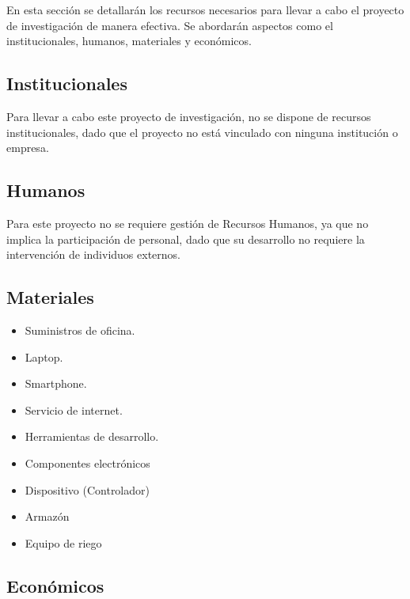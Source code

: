 En esta sección se detallarán los recursos necesarios para llevar a cabo el proyecto de investigación de manera efectiva. Se abordarán aspectos como el institucionales, humanos, materiales y económicos.
\subsection{Institucionales}
Para llevar a cabo este proyecto de investigación, no se dispone de recursos institucionales, dado que el proyecto no está vinculado con ninguna institución o empresa.

\subsection{Humanos}
Para este proyecto no se requiere gestión de Recursos Humanos, ya que no implica la participación de personal, dado que su desarrollo no requiere la intervención de individuos externos.

\subsection{Materiales}
\begin{itemize}
	\item Suministros de oficina.
	\item Laptop.
	\item Smartphone.
	\item Servicio de internet.
	\item Herramientas de desarrollo.
	\item Componentes electrónicos
	\item Dispositivo (Controlador)
	\item Armazón
	\item Equipo de riego
\end{itemize}

\newpage
\subsection{Económicos}

